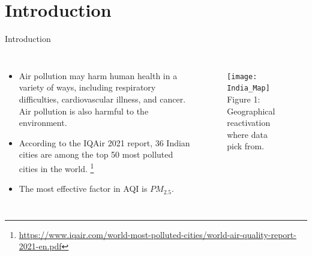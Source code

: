 \documentclass[12pt, aspectratio=169]{beamer}
\begin{document}
\section{Introduction}
\begin{frame}{Introduction}
	\begin{columns}
		\begin{itemize}
			\item   Air pollution may harm human health in a variety of ways, including respiratory difficulties, cardiovascular illness, and cancer. Air pollution is also harmful to the environment.
			\item According to the IQAir 2021 report, 36 Indian cities are among the top 50 most polluted cities in the world. \footnote[1]{\href{https://www.iqair.com/world-most-polluted-cities/world-air-quality-report-2021-en.pdf}{https://www.iqair.com/world-most-polluted-cities/world-air-quality-report-2021-en.pdf}} \\
			\item The most effective factor in AQI is $PM_{2.5}$.
		\end{itemize}
		\begin{figure}
			\centering
			\texttt{[image: India\_Map]}\\ 
			\scriptsize{Figure 1: Geographical reactivation where data pick from.}
		\end{figure}
	\end{columns}
	
\end{frame}




 
\end{document}
